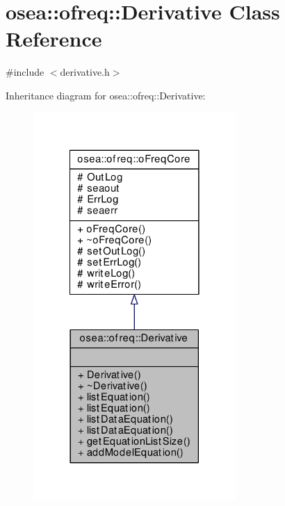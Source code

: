 \hypertarget{classosea_1_1ofreq_1_1_derivative}{\section{osea\-:\-:ofreq\-:\-:Derivative Class Reference}
\label{classosea_1_1ofreq_1_1_derivative}
}


{\ttfamily \#include $<$derivative.\-h$>$}



Inheritance diagram for osea\-:\-:ofreq\-:\-:Derivative\-:\nopagebreak
\begin{figure}[H]
\begin{center}
\leavevmode
\includegraphics[width=218pt]{classosea_1_1ofreq_1_1_derivative__inherit__graph}
\end{center}
\end{figure}
